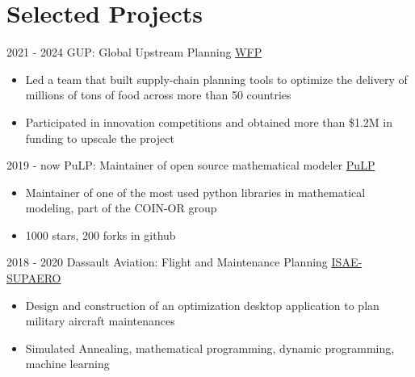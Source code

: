 \documentclass[letterpaper]{twentysecondcv} %
\begin{document}
\section{Selected Projects}
\begin{twenty}
  \twentyitem
      {2021 - 2024}
    {}
        {GUP: Global Upstream Planning}
        {\href{https://www.wfp.org/}{WFP}}
        {}
        {
        {\begin{itemize}
        \item Led a team that built supply-chain planning tools to optimize the delivery of millions of tons of food across more than 50 countries
        \item Participated in innovation competitions and obtained more than \$1.2M in funding to upscale the project
        \vspace{2mm}
        \end{itemize}}
        }
  \twentyitem
      {2019 - now}
    {}
        {PuLP: Maintainer of open source mathematical modeler}
        {\href{https://github.com/coin-or/pulp}{PuLP}}
        {}
        {
        {\begin{itemize}
        \item Maintainer of one of the most used python libraries in mathematical modeling, part of the COIN-OR group
        \item 1000 stars, 200 forks in github
        \vspace{2mm}
        \end{itemize}}
        }
  \twentyitem
      {2018 - 2020}
    {}
        {Dassault Aviation: Flight and Maintenance Planning}
        {\href{https://www.isae-supaero.fr/en/}{ISAE-SUPAERO}}
        {}
        {
        {\begin{itemize}
        \item Design and construction of an optimization desktop application to plan military aircraft maintenances
        \item Simulated Annealing, mathematical programming, dynamic programming, machine learning
        \vspace{2mm}
        \end{itemize}}
        }

\end{twenty}
\end{document}

